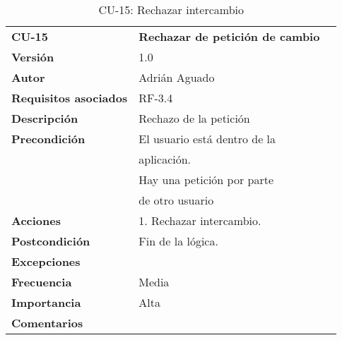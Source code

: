\begin{table}
\begin{tabular}{llr}  
\toprule
\begin{minipage}[b]{0.24\columnwidth}\raggedright\strut
\textbf{CU-15}\strut
\end{minipage} & \begin{minipage}[b]{0.72\columnwidth}\raggedright\strut
\textbf{Rechazar de petición de cambio}\strut
\end{minipage}\tabularnewline
\cmidrule(r){1-2}
\textbf{Versión}       & 1.0           \\
\textbf{Autor}       & Adrián  Aguado    \\
\textbf{Requisitos asociados}       & RF-3.4 \\
\textbf{Descripción} & Rechazo de la petición\\
\textbf{Precondición}  & El usuario está dentro de la \\
& aplicación.      \\
& Hay una petición por parte \\
& de otro usuario \\
\textbf{Acciones} & 1. Rechazar intercambio. \\
\textbf{Postcondición} & Fin de la lógica. \\
\textbf{Excepciones} &     \\
\textbf{Frecuencia} & Media          \\
\textbf{Importancia} & Alta            \\
\textbf{Comentarios } &  \\
\bottomrule
\end{tabular}
\caption{CU-15: Rechazar intercambio} 
\end{table}

